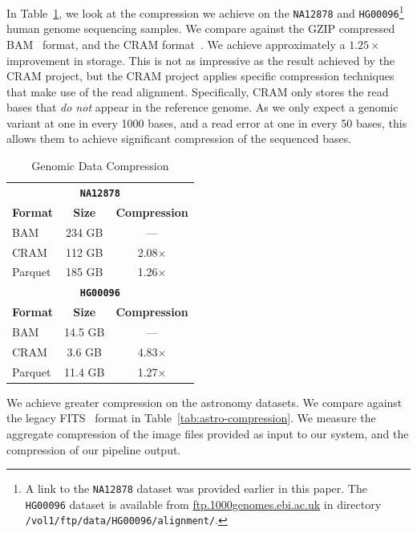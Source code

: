 \documentclass[10pt]{report} %
\begin{document}
In Table~\ref{tab:genomic-compression}, we look at the compression we achieve on the \texttt{NA12878}
and \texttt{HG00096}\footnote{A link to the \texttt{NA12878} dataset was provided earlier in this paper. The
\texttt{HG00096} dataset is available from \url{ftp.1000genomes.ebi.ac.uk} in directory 
\texttt{/vol1/ftp/data/HG00096/alignment/}.} human genome sequencing samples. We compare against the
GZIP compressed BAM~\cite{li09} format, and the CRAM format~\cite{fritz11}. We achieve approximately a
$1.25\times$ improvement in storage. This is not as impressive as the result achieved by the CRAM project,
but the CRAM project applies specific compression techniques that make use of the read alignment. Specifically,
CRAM only stores the read bases that \emph{do not} appear in the reference genome. As we only expect a
genomic variant at one in every 1000 bases, and a read error at one in every 50 bases, this allows them to
achieve significant compression of the sequenced bases.

\begin{table}[h]
\caption{Genomic Data Compression}
\label{tab:genomic-compression}
\begin{center}
\begin{tabular}{ l c c }
\hline
\multicolumn{3}{c}{\bf \texttt{NA12878}} \\
\bf Format & \bf Size & \bf Compression \\
\hline
\hline
BAM & 234 GB & --- \\
CRAM & 112 GB & 2.08$\times$ \\
Parquet & 185 GB & 1.26$\times$ \\
\hline
\multicolumn{3}{c}{\bf \texttt{HG00096}} \\
\bf Format & \bf Size & \bf Compression \\
\hline
\hline
BAM & 14.5 GB & --- \\
CRAM & 3.6 GB & 4.83$\times$ \\
Parquet & 11.4 GB & 1.27$\times$ \\
\hline
\end{tabular}
\end{center}
\end{table}

We achieve greater compression on the astronomy datasets. We compare against the legacy FITS~\cite{wells81}
format in Table~\ref{tab:astro-compression}. We measure the aggregate compression of the image files provided
as input to our system, and the compression of our pipeline output.
\end{document}
